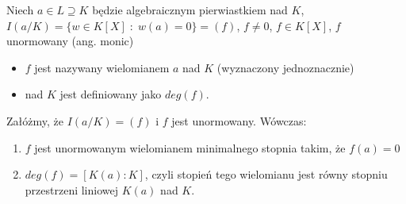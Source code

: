 \begin{definition}
Niech $a\in L\supseteq K$ będzie algebraicznym pierwiastkiem nad $K$, $I(a/K)=\{w\in K[X]\;:\;w(a)=0\}=(f)$, $f\neq 0$, $f\in K[X]$, $f$ unormowany (ang. monic)
\begin{itemize}
    \item $f$ jest nazywany wielomianem  $a$ nad $K$ (wyznaczony jednoznacznie)
    \item {} nad $K$ jest definiowany jako $deg(f)$.
\end{itemize}
\end{definition}


\begin{remark}[$I(a/K)=(f)\implies deg(f)=\begin{bmatrix}K(a):K\end{bmatrix}$]
    Załóżmy, że $I(a/K)=(f)$ i $f$ jest unormowany. Wówczas:
    \begin{enumerate}
    \item $f$ jest unormowanym wielomianem minimalnego stopnia takim, że $f(a)=0$

    \item $deg(f)=[K(a):K]$, czyli stopień tego wielomianu jest równy stopniu przestrzeni liniowej $K(a)$ nad $K$.
    \end{enumerate}
\end{remark}

